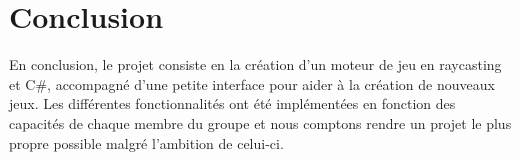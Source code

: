 \documentclass[french, 12pt]{article}
\begin{document}
    \Huge
    \color{black}
    \section{Conclusion}

    \normalsize

    En conclusion, le projet consiste en la création d'un moteur de jeu en raycasting et C\#, accompagné d'une petite interface pour aider à la création de nouveaux jeux. Les différentes fonctionnalités ont été implémentées en fonction des capacités de chaque membre du groupe et nous comptons rendre un projet le plus propre possible malgré l'ambition de celui-ci.
    
        
\end{document}
